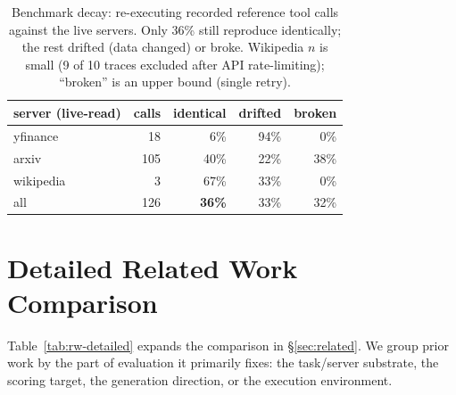 \begin{table}[t]
  \centering \small
  \begin{tabular}{lrrrr}
    \toprule
    server (live-read) & calls & identical & drifted & broken \\
    \midrule
    yfinance & 18 & 6\% & 94\% & 0\% \\
    arxiv & 105 & 40\% & 22\% & 38\% \\
    wikipedia & 3 & 67\% & 33\% & 0\% \\
    \midrule
    all & 126 & \textbf{36\%} & 33\% & 32\% \\
    \bottomrule
  \end{tabular}
  \caption{Benchmark decay: re-executing recorded reference tool calls against
    the live servers. Only 36\% still reproduce identically; the rest drifted
    (data changed) or broke. Wikipedia $n$ is small (9 of 10 traces excluded
    after API rate-limiting); ``broken'' is an upper bound (single retry).}
  \label{tab:decay}
\end{table}


\section{Detailed Related Work Comparison}
\label{app:rw}

Table~\ref{tab:rw-detailed} expands the comparison in
\S\ref{sec:related}. We group prior work by the part of evaluation it
primarily fixes: the task/server substrate, the scoring target, the generation
direction, or the execution environment.

